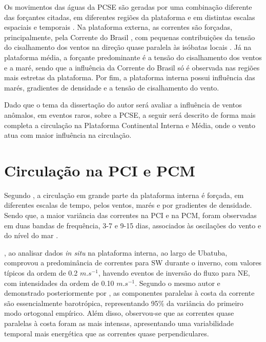 \hspace{5mm} Os movimentos das águas da PCSE são geradas por uma combinação diferente das forçantes citadas, em diferentes regiões da plataforma e em distintas escalas espaciais e temporais \citep{castro1996correntes}. Na plataforma externa, as correntes são forçadas, principalmente, pela Corrente do Brasil \citep{castro2008processos}, com pequenas contribuições da tensão do cisalhamento dos ventos na direção quase paralela às isóbatas locais \citep{dottori2009response}. Já na plataforma média, a forçante predominante é a tensão do cisalhamento dos ventos e a maré, sendo que a influência da Corrente do Brasil só é observada nas regiões mais estretas da plataforma. Por fim, a plataforma interna possui influência das marés, gradientes de densidade e a tensão de cisalhamento do vento.

\hspace{5mm} Dado que o tema da dissertação do autor será avaliar a influência de ventos anômalos, em eventos raros, sobre a PCSE, a seguir será descrito de forma mais completa a circulação na Plataforma Continental Interna e Média, onde o vento atua com maior influência na circulação.

\section{Circulação na PCI e PCM}

\hspace{5mm} Segundo \cite{castro1996correntes}, a circulação em grande parte da plataforma interna é forçada, em diferentes escalas de tempo, pelos ventos, marés e por gradientes de densidade. Sendo que, a maior variância das correntes na PCI e na PCM, foram observadas em duas bandas de frequência, 3-7 e 9-15 dias, associados às oscilações do vento e do nível do mar \citep{castro1998physical}.

\hspace{5mm} \cite{castro1996correntes}, ao analisar dados \textit{in situ} na plataforma interna, ao largo de Ubatuba, comprovou a predominância de correntes para SW durante o inverno, com valores típicos da ordem de 0.2 $m.s^{-1}$, havendo eventos de inversão do fluxo para NE, com intensidades da ordem de 0.10 $m.s^{-1}$. Segundo o mesmo autor e demonstrado posteriormente por \cite{dottori2009response}, as componentes paralelas à costa da corrente são essencialmente barotrópica, representando 95$\%$ da variância do primeiro modo ortogonal empírico. Além disso, observou-se que as correntes quase paralelas à costa foram as mais intensas, apresentando uma variabilidade temporal mais energética que as correntes quase perpendiculares.

